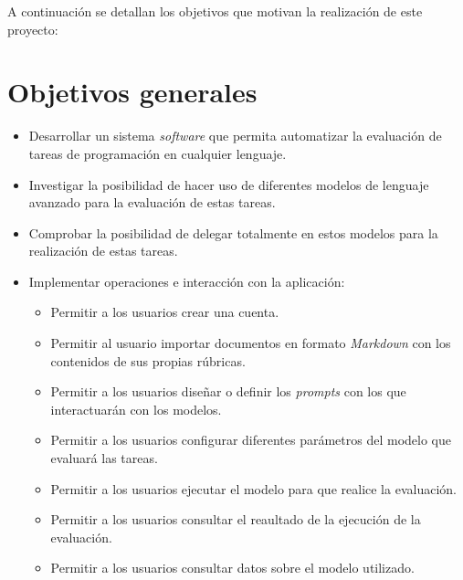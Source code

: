 
A continuación se detallan los objetivos que motivan la realización de este proyecto:

\section{Objetivos generales}\label{objetivos_generales}

\begin{itemize}
    \item Desarrollar un sistema \textit{software} que permita automatizar la evaluación de tareas de programación en cualquier lenguaje.
    \item Investigar la posibilidad de hacer uso de diferentes modelos de lenguaje avanzado para la evaluación de estas tareas.
    \item Comprobar la posibilidad de delegar totalmente en estos modelos para la realización de estas tareas.
    \item Implementar operaciones e interacción con la aplicación:
    \begin{itemize}
        \item Permitir a los usuarios crear una cuenta.
        \item Permitir al usuario importar documentos en formato \textit{Markdown} con los contenidos de sus propias rúbricas.
        \item Permitir a los usuarios diseñar o definir los \textit{prompts} con los que interactuarán con los modelos.
        \item Permitir a los usuarios configurar diferentes parámetros del modelo que evaluará las tareas.
        \item Permitir a los usuarios ejecutar el modelo para que realice la evaluación.
        \item Permitir a los usuarios consultar el reaultado de la ejecución de la evaluación.
        \item Permitir a los usuarios consultar datos sobre el modelo utilizado.
    \end{itemize}
\end{itemize}


